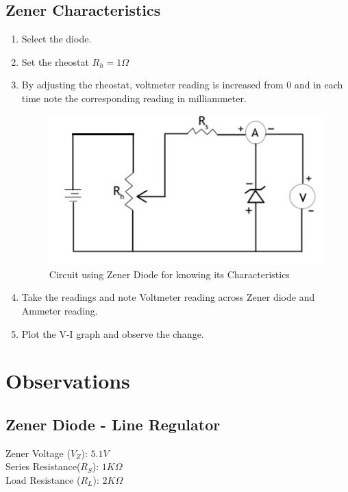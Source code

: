 			\subsection{Zener Characteristics}
				\begin{enumerate}
					\tightlist
					\item Select the diode.
					\item Set the rheostat $R_h=1\Omega$
					\item By adjusting the rheostat, voltmeter reading is increased from 0 and in each time note the corresponding reading in milliammeter.
					\begin{figure}[h]
						\centering
						\includegraphics[width=0.5\linewidth]{img/exp8/7}
						\caption{Circuit using Zener Diode for knowing its Characteristics}
						\label{fig:zener_Procedure_charac}
					\end{figure}
					\item Take the readings and note Voltmeter reading across Zener diode and Ammeter reading.
					\item Plot the V-I graph and observe the change.
				\end{enumerate}
		
		\section{Observations}
			\subsection{Zener Diode - Line Regulator}
			Zener Voltage ($V_{Z}$): $5.1 V$\\
			Series Resistance($R_{S}$): $1 K\Omega$\\
			Load Resistance ($R_L$): $2 K\Omega$
			

